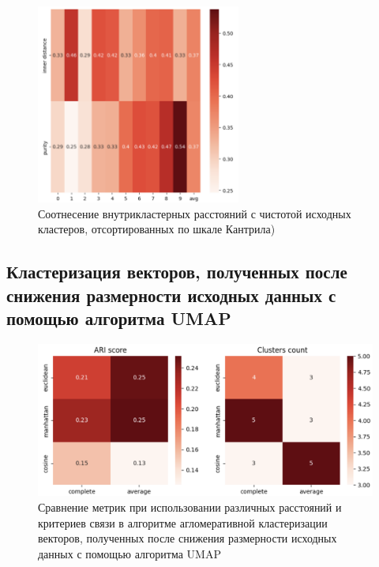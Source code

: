 \begin{figure}
	\begin{center}
		\includegraphics[width=0.6\textwidth]{images/4.png}
	\end{center}
	\caption{Соотнесение внутрикластерных расстояний с чистотой исходных кластеров, отсортированных по шкале Кантрила)}
	\label{img:3}
\end{figure}

\FloatBarrier

\subsection{Кластеризация векторов, полученных после снижения размерности исходных данных с помощью алгоритма UMAP}

\begin{figure}
	\begin{center}
		\includegraphics[width=\textwidth]{images/5.png}
	\end{center}
	\caption{Сравнение метрик при использовании различных расстояний и критериев связи в алгоритме агломеративной кластеризации векторов, полученных после снижения размерности исходных данных с помощью алгоритма UMAP}
	\label{img:4}
\end{figure}

